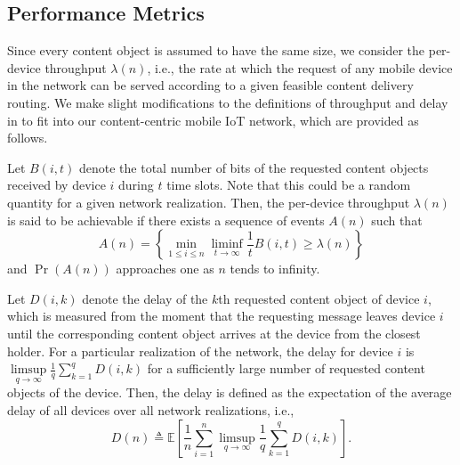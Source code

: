 \documentclass[10pt,journal,compsoc,onecolumn]{IEEEtran}
\begin{document}
\subsection{Performance Metrics}
Since every content object is assumed to have the same size, we
consider the per-device throughput $\lambda(n)$, i.e., the rate at
which the request of any mobile device in the network can be served
according to a given feasible content delivery routing. We make
slight modifications to the definitions of throughput and delay in
\cite{c1} to fit into our content-centric mobile IoT network,
which are provided as follows.
\begin{definition}[Throughput] Let $B(i,t)$ denote the total number of bits of the requested content objects received by device $i$ during $t$ time slots. Note that this could be a random quantity for a given network realization.
Then, the per-device throughput $\lambda(n)$ is said to be achievable if there exists a sequence of events $A(n)$ such that
\begin{equation}
A(n)  =\left\lbrace \min_{1\leq i \leq n} \liminf\limits_{t\rightarrow \infty} \frac{1}{t} B(i,t) \geq \lambda(n)\right\rbrace \nonumber
\end{equation}
and $\Pr\left(A(n)\right)$ approaches one as $n$ tends to infinity.
\end{definition}
\begin{definition}[Delay] Let $D(i,k)$ denote the delay of the $k$th requested content object of device $i$, which is measured from the moment that the requesting message leaves device $i$ until the corresponding content object arrives at the device from the closest holder. For a particular realization of the network, the delay for device $i$ is $\limsup\limits_{q\rightarrow \infty} \frac{1}{q} \sum_{k=1}^q D(i,k)$ for a sufficiently large number of requested content objects of the device.
Then, the delay is defined as the expectation of the average delay of all devices over all network realizations, i.e.,
\begin{equation}
D(n) \triangleq \mathbb{E}\left[\frac{1}{n} \sum_{i=1}^n \limsup\limits_{q\rightarrow \infty} \frac{1}{q} \sum_{k=1}^q D(i,k)\right]. \nonumber
\end{equation}
\end{definition}
\end{document}
